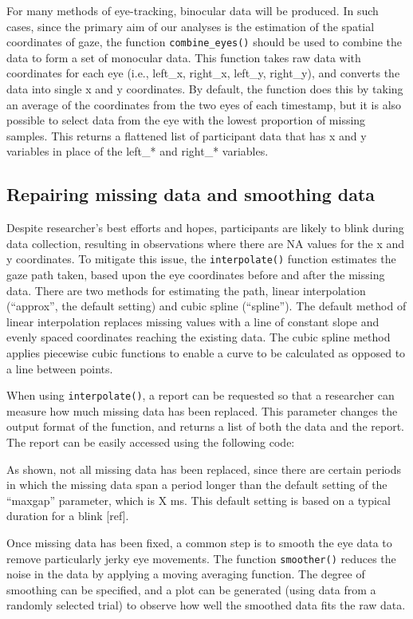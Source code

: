 \documentclass[
  man,
  floatsintext,
  longtable,
  nolmodern,
  notxfonts,
  notimes,
  colorlinks=true,linkcolor=blue,citecolor=blue,urlcolor=blue]{apa7}
\begin{document}
For many methods of eye-tracking, binocular data will be produced. In
such cases, since the primary aim of our analyses is the estimation of
the spatial coordinates of gaze, the function \texttt{combine\_eyes()}
should be used to combine the data to form a set of monocular data. This
function takes raw data with coordinates for each eye (i.e., left\_x,
right\_x, left\_y, right\_y), and converts the data into single x and y
coordinates. By default, the function does this by taking an average of
the coordinates from the two eyes of each timestamp, but it is also
possible to select data from the eye with the lowest proportion of
missing samples. This returns a flattened list of participant data that
has x and y variables in place of the left\_* and right\_* variables.

\subsection{Repairing missing data and smoothing
data}\label{repairing-missing-data-and-smoothing-data}

Despite researcher's best efforts and hopes, participants are likely to
blink during data collection, resulting in observations where there are
NA values for the x and y coordinates. To mitigate this issue, the
\texttt{interpolate()} function estimates the gaze path taken, based
upon the eye coordinates before and after the missing data. There are
two methods for estimating the path, linear interpolation (``approx'',
the default setting) and cubic spline (``spline''). The default method
of linear interpolation replaces missing values with a line of constant
slope and evenly spaced coordinates reaching the existing data. The
cubic spline method applies piecewise cubic functions to enable a curve
to be calculated as opposed to a line between points.

When using \texttt{interpolate()}, a report can be requested so that a
researcher can measure how much missing data has been replaced. This
parameter changes the output format of the function, and returns a list
of both the data and the report. The report can be easily accessed using
the following code:

As shown, not all missing data has been replaced, since there are
certain periods in which the missing data span a period longer than the
default setting of the ``maxgap'' parameter, which is X ms. This default
setting is based on a typical duration for a blink {[}ref{]}.

Once missing data has been fixed, a common step is to smooth the eye
data to remove particularly jerky eye movements. The function
\texttt{smoother()} reduces the noise in the data by applying a moving
averaging function. The degree of smoothing can be specified, and a plot
can be generated (using data from a randomly selected trial) to observe
how well the smoothed data fits the raw data.
\end{document}
